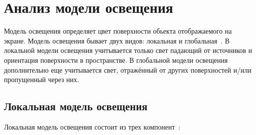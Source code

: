 \clearpage
\section{Анализ модели освещения}
Модель освещения определяет цвет поверхности обьекта отображаемого на экране. Модель освещения бывает двух видов: локальная и глобальная~\cite{rodgersCG}. В локальной модели освещения учитывается только свет падающий от источников и ориентация поверхности в пространстве. В глобальной модели освещения дополнительно еще учитывается свет, отражённый от других поверхностей и/или пропущенный через них.

\subsection{Локальная модель освещения}
Локальная модель освещения состоит из трех компонент~\cite{Phong1975}:

